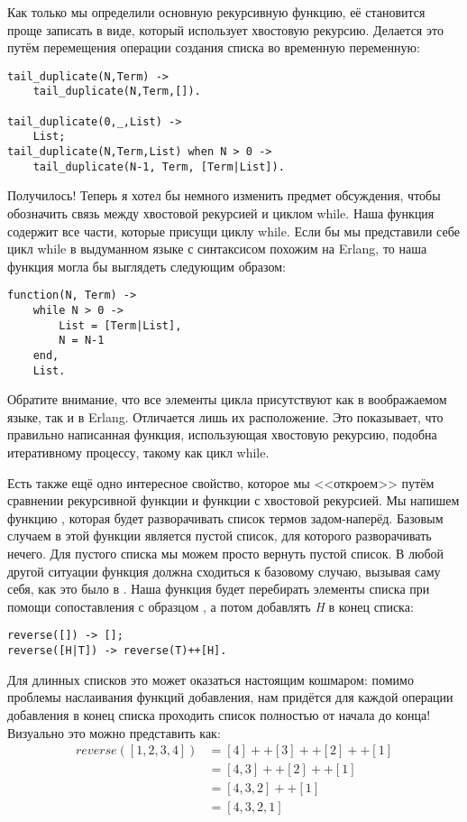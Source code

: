 Как только мы определили основную рекурсивную функцию, её становится проще записать в виде, который использует хвостовую рекурсию.
Делается это путём перемещения операции создания списка во временную переменную:
\begin{lstlisting}[style=erlang]
tail_duplicate(N,Term) ->
    tail_duplicate(N,Term,[]).
 
tail_duplicate(0,_,List) ->
    List;
tail_duplicate(N,Term,List) when N > 0 ->
    tail_duplicate(N-1, Term, [Term|List]).
\end{lstlisting}

Получилось!
Теперь я хотел бы немного изменить предмет обсуждения, чтобы обозначить связь между хвостовой рекурсией и циклом while.
Наша функция  содержит все части, которые присущи циклу while.
Если бы мы представили себе цикл while в выдуманном языке с синтаксисом похожим на Erlang, то наша функция могла бы выглядеть следующим образом:
\begin{lstlisting}[style=erlang]
function(N, Term) ->
    while N > 0 ->
        List = [Term|List],
        N = N-1
    end,
    List.
\end{lstlisting}

Обратите внимание, что все элементы цикла присутствуют как в воображаемом языке, так и в Erlang.
Отличается лишь их расположение.
Это показывает, что правильно написанная функция, использующая хвостовую рекурсию, подобна итеративному процессу, такому как цикл while.

Есть также ещё одно интересное свойство, которое мы <<откроем>> путём сравнении рекурсивной функции и функции с хвостовой рекурсией.
Мы напишем функцию , которая будет разворачивать список термов задом\--наперёд.
Базовым случаем в этой функции является пустой список, для которого разворачивать нечего.
Для пустого списка мы можем просто вернуть пустой список.
В любой другой ситуации функция должна сходиться к базовому случаю, вызывая саму себя, как это было в .
Наша функция будет перебирать элементы списка при помощи сопоставления с образцом \ops{H|T]}, а потом добавлять \emph{H} в конец списка:
\begin{lstlisting}[style=erlang]
reverse([]) -> [];
reverse([H|T]) -> reverse(T)++[H].
\end{lstlisting}

Для длинных списков это может оказаться настоящим кошмаром: помимо проблемы наслаивания функций добавления, нам придётся для каждой операции добавления в конец списка проходить список полностью от начала до конца!
Визуально это можно представить как:
\begin{align*}
reverse([1,2,3,4]) &= [4]++[3]++[2]++[1]\\
&= [4,3]++[2]++[1]\\
&= [4,3,2]++[1]\\
&= [4,3,2,1]\\
\end{align*}

